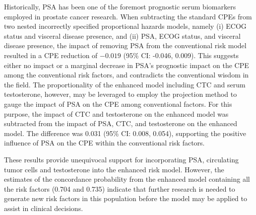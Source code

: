 \documentclass[12pt]{article}
\begin{document}
Historically, PSA has been one of the foremost prognostic serum biomarkers employed in prostate cancer research. When subtracting the standard CPEs from two nested incorrectly specified proportional hazards models, namely (i) ECOG status and visceral disease presence, and (ii) PSA, ECOG status, and visceral disease presence, the impact of removing PSA from the conventional risk model resulted in a CPE reduction of  $-0.019$  (95\% CI: -0.046, 0.009).  This suggests either no impact or a marginal decrease in PSA's prognostic impact  on the CPE among the conventional risk factors, and contradicts the conventional wisdom in the field. The proportionality of the enhanced model including CTC and serum testosterone, however, may be leveraged to employ the projection method to gauge the impact of PSA on the CPE among conventional factors. For this purpose, the impact of CTC and testosterone on the enhanced model was subtracted from the impact of PSA, CTC, and testosterone on the enhanced model. The difference was 0.031 (95\% CI: 0.008, 0.054), supporting the positive influence of PSA on the CPE within the conventional risk factors.  

These results provide unequivocal support for incorporating PSA, circulating tumor cells and testosterone into the enhanced risk model. However, the estimates of the concordance probability from the enhanced model containing all the risk factors (0.704 and 0.735) indicate that further research is needed to generate new risk factors in this population before the model may be applied to assist in clinical decisions.


\end{document}
